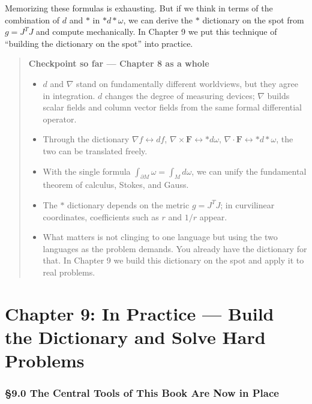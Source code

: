 \documentclass[a4paper,12pt,openany]{book}
\begin{document}
Memorizing these formulas is exhausting. But if we think in terms of the
combination of \(d\) and \(\ast\) in \(\ast d\ast\omega\), we can derive
the \(\ast\) dictionary on the spot from \(g = J^T J\) and compute
mechanically. In Chapter 9 we put this technique of ``building the
dictionary on the spot'' into practice.

\begin{quote}
\textbf{Checkpoint so far — Chapter 8 as a whole}

\begin{itemize}
\item
  \(d\) and \(\nabla\) stand on fundamentally different worldviews, but
  they agree in integration. \(d\) changes the degree of measuring
  devices; \(\nabla\) builds scalar fields and column vector fields from
  the same formal differential operator.
\item
  Through the dictionary \(\nabla f \leftrightarrow df\),
  \(\nabla\times\mathbf{F} \leftrightarrow \ast d\omega\),
  \(\nabla\cdot\mathbf{F} \leftrightarrow \ast d\ast\omega\), the two
  can be translated freely.
\item
  With the single formula \(\int_{\partial M}\omega = \int_M d\omega\),
  we can unify the fundamental theorem of calculus, Stokes, and Gauss.
\item
  The \(\ast\) dictionary depends on the metric \(g = J^T J\); in
  curvilinear coordinates, coefficients such as \(r\) and \(1/r\)
  appear.
\item
  What matters is not clinging to one language but using the two
  languages as the problem demands. You already have the dictionary for
  that. In Chapter 9 we build this dictionary on the spot and apply it
  to real problems.
\end{itemize}
\end{quote}

\newpage

\hypertarget{chapter-9-in-practice-build-the-dictionary-and-solve-hard-problems}{%
\chapter{Chapter 9: In Practice — Build the Dictionary and Solve Hard
Problems}\label{chapter-9-in-practice-build-the-dictionary-and-solve-hard-problems}}

\hypertarget{the-central-tools-of-this-book-are-now-in-place}{%
\subsection{§9.0 The Central Tools of This Book Are Now in
Place}\label{the-central-tools-of-this-book-are-now-in-place}}
\end{document}
